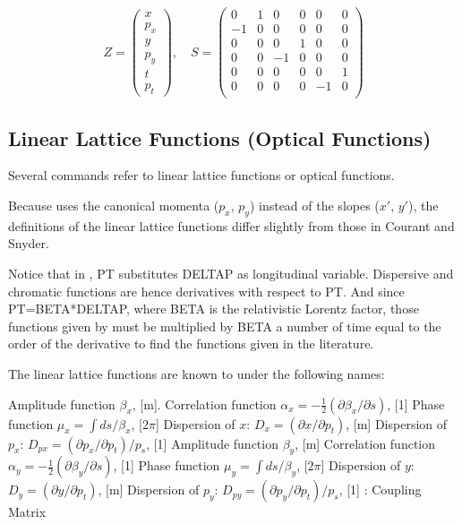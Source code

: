 \begin{equation}
Z = \left(
\begin{array}{l} x \\ p_x \\ y \\ p_y \\ t \\ p_t
\end{array} \right), \quad
S =
 \begin{pmatrix}
  0 & 1 & 0 & 0 & 0 & 0 \\
  -1 & 0 & 0 & 0 & 0 & 0 \\
  0 & 0 & 0 & 1 & 0 & 0 \\
  0 & 0 & -1 & 0 & 0 & 0 \\
  0 & 0 & 0 & 0 & 0 & 1 \\
  0 & 0 & 0 & 0 & -1 & 0 \\
 \end{pmatrix}
\end{equation}


\subsection{Linear Lattice Functions (Optical Functions)}
\label{subsec:tables_linear}
Several \madx commands refer to linear lattice functions or optical
functions.  

Because \madx uses the canonical momenta ($p_x$, $p_y$) instead of the
slopes ($x'$, $y'$), the definitions of the linear lattice functions
differ slightly from those in Courant and Snyder\cite{Courant_Snyder1958}.

Notice that in \madx, PT substitutes DELTAP as longitudinal
variable. 
Dispersive and chromatic functions are hence derivatives with
respect to PT. 
And since PT=BETA*DELTAP, where BETA is the relativistic Lorentz 
factor, those functions given by \madx must be multiplied by BETA a
number of time equal to the order of the derivative to find the
functions given in the literature. 

The linear lattice functions are known to \madx under the following names:
\begin{madlist}
   Amplitude function $\beta_x$, [m].   
   Correlation function 
  $\alpha_x = - \frac{1}{2} (\partial \beta_x / \partial s)$, [1]   
   Phase function $\mu_x = \int ds / \beta_x$, [$2 \pi$]
   Dispersion of $x$: $D_x = (\partial x / \partial p_t)$, [m] 
   Dispersion of $p_x$: $D_{px} = (\partial p_x / \partial p_t) / p_s$, [1] 
   Amplitude function $\beta_y$, [m]   
   Correlation function 
  $\alpha_y = - \frac{1}{2} ( \partial \beta_y / \partial s)$, [1] 
   Phase function $\mu_y = \int ds / \beta_y$, [$2 \pi$]
   Dispersion of $y$: $D_y = (\partial y / \partial p_t)$, [m] 
   Dispersion of $p_y$: $D_{py} = ( \partial p_y / \partial p_t) / p_s$, [1] 
   : Coupling Matrix     
\end{madlist}

